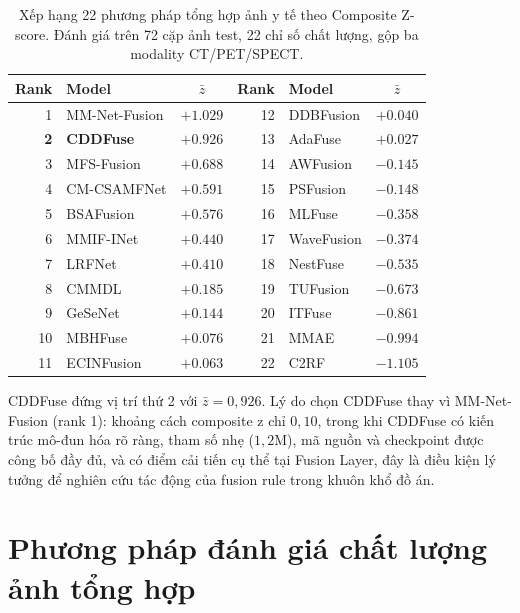 \begin{table}[H]
\centering
\small
\caption{Xếp hạng 22 phương pháp tổng hợp ảnh y tế theo Composite Z-score. Đánh giá trên 72 cặp ảnh test, 22 chỉ số chất lượng, gộp ba modality CT/PET/SPECT.}
\label{tab:zscore-ranking}
\begin{tabular}{rlc|rlc}
\toprule
\textbf{Rank} & \textbf{Model} & \textbf{$\bar{z}$} & \textbf{Rank} & \textbf{Model} & \textbf{$\bar{z}$} \\
\midrule
1  & MM-Net-Fusion          & $+1.029$ & 12 & DDBFusion         & $+0.040$ \\
\textbf{2}  & \textbf{CDDFuse} \cite{zhao2023cddfuse} & $\mathbf{+0.926}$ & 13 & AdaFuse           & $+0.027$ \\
3  & MFS-Fusion             & $+0.688$ & 14 & AWFusion          & $-0.145$ \\
4  & CM-CSAMFNet            & $+0.591$ & 15 & PSFusion          & $-0.148$ \\
5  & BSAFusion              & $+0.576$ & 16 & MLFuse            & $-0.358$ \\
6  & MMIF-INet              & $+0.440$ & 17 & WaveFusion        & $-0.374$ \\
7  & LRFNet                 & $+0.410$ & 18 & NestFuse          & $-0.535$ \\
8  & CMMDL                  & $+0.185$ & 19 & TUFusion          & $-0.673$ \\
9  & GeSeNet                & $+0.144$ & 20 & ITFuse            & $-0.861$ \\
10 & MBHFuse                & $+0.076$ & 21 & MMAE              & $-0.994$ \\
11 & ECINFusion             & $+0.063$ & 22 & C2RF              & $-1.105$ \\
\bottomrule
\end{tabular}
\end{table}

CDDFuse đứng vị trí thứ 2 với $\bar{z} = 0{,}926$. Lý do chọn CDDFuse thay vì MM-Net-Fusion (rank 1): khoảng cách composite z chỉ $0{,}10$, trong khi CDDFuse có kiến trúc mô-đun hóa rõ ràng, tham số nhẹ ($1{,}2$M), mã nguồn và checkpoint được công bố đầy đủ, và có điểm cải tiến cụ thể tại Fusion Layer, đây là điều kiện lý tưởng để nghiên cứu tác động của fusion rule trong khuôn khổ đồ án.

\section{Phương pháp đánh giá chất lượng ảnh tổng hợp}
\label{sec:eval-bg}

